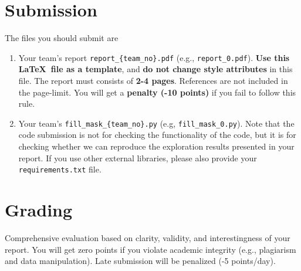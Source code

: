 \documentclass[UTF8]{article}
\begin{document}
\section{Submission}

The files you should submit are
\begin{enumerate}
  \item Your team's report \texttt{report\_\{team\_no\}.pdf} (e.g., \texttt{report\_0.pdf}). \textbf{Use this \LaTeX\ file as a template}, and \textbf{do not change style attributes} in this file. The report must consists of \textbf{2-4 pages}. References are not included in the page-limit. You will get a \textbf{penalty (-10 points)} if you fail to follow this rule.
  \item Your team's \texttt{fill\_mask\_\{team\_no\}.py} (e.g, \texttt{fill\_mask\_0.py}). Note that the code submission is not for checking the functionality of the code, but it is for checking whether we can reproduce the exploration results presented in your report. If you use other external libraries, please also provide your \texttt{requirements.txt} file.
\end{enumerate}


\section{Grading}

Comprehensive evaluation based on clarity, validity, and interestingness of your report. You will get zero points if you violate academic integrity (e.g., plagiarism and data manipulation). Late submission will be penalized (-5 points/day).


\pagebreak


\end{document}
